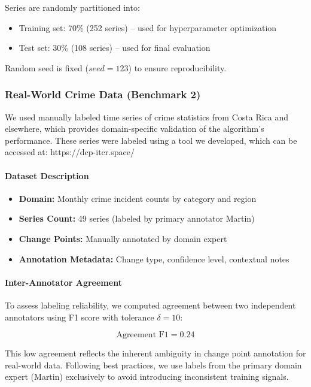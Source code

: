 \documentclass[journal,article,submit,pdftex,moreauthors]{Definitions/mdpi}
\begin{document}
Series are randomly partitioned into:
\begin{itemize}
    \item Training set: 70\% (252 series) -- used for hyperparameter optimization
    \item Test set: 30\% (108 series) -- used for final evaluation
\end{itemize}

Random seed is fixed ($seed=123$) to ensure reproducibility.

\subsubsection{Real-World Crime Data (Benchmark 2)}
\label{sec:real_data}

We used manually labeled time series of crime statistics from Costa Rica and elsewhere, which provides domain-specific validation of the algorithm's performance. These series were labeled using a tool we developed, which can be accessed at: https://dcp-itcr.space/

\paragraph{Dataset Description}

\begin{itemize}
    \item \textbf{Domain:} Monthly crime incident counts by category and region
    \item \textbf{Series Count:} 49 series (labeled by primary annotator Martin)
    \item \textbf{Change Points:} Manually annotated by domain expert
    \item \textbf{Annotation Metadata:} Change type, confidence level, contextual notes
\end{itemize}

\paragraph{Inter-Annotator Agreement}

To assess labeling reliability, we computed agreement between two independent annotators using F1 score with tolerance $\delta=10$:

\begin{equation}
\text{Agreement F1} = 0.24
\end{equation}

This low agreement reflects the inherent ambiguity in change point annotation for real-world data. Following best practices, we use labels from the primary domain expert (Martin) exclusively to avoid introducing inconsistent training signals.
\end{document}
